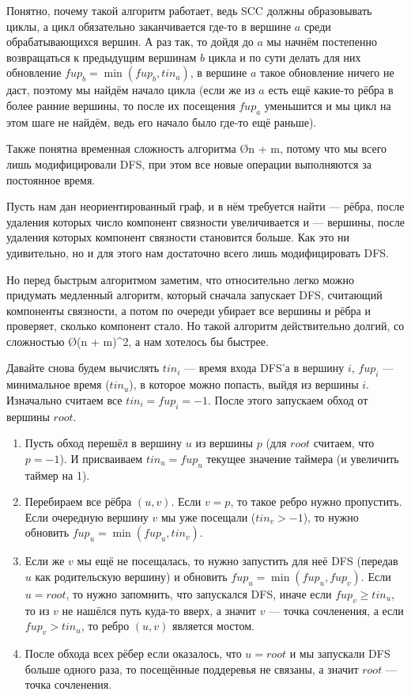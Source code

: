 Понятно, почему такой алгоритм работает, ведь SCC должны образовывать циклы, а цикл обязательно заканчивается где-то в вершине $a$ среди обрабатывающихся вершин. А раз так, то дойдя до $a$ мы начнём постепенно возвращаться к предыдущим вершинам $b$ цикла и по сути делать для них обновление $fup_b = \min(fup_b, tin_a)$, в вершине $a$ такое обновление ничего не даст, поэтому мы найдём начало цикла (если же из $a$ есть ещё какие-то рёбра в более ранние вершины, то после их посещения $fup_a$ уменьшится и мы цикл на этом шаге не найдём, ведь его начало было где-то ещё раньше).

Также понятна временная сложность алгоритма \O{n + m}, потому что мы всего лишь модифицировали DFS, при этом все новые операции выполняются за постоянное время.


Пусть нам дан неориентированный граф, и в нём требуется найти  — рёбра, после удаления которых число компонент связности увеличивается и  — вершины, после удаления которых компонент связности становится больше. Как это ни удивительно, но и для этого нам достаточно всего лишь модифицировать DFS.

Но перед быстрым алгоритмом заметим, что относительно легко можно придумать медленный алгоритм, который сначала запускает DFS, считающий компоненты связности, а потом по очереди убирает все вершины и рёбра и проверяет, сколько компонент стало. Но такой алгоритм действительно долгий, со сложностью \O{(n + m)^2}, а нам хотелось бы быстрее.

Давайте снова будем вычислять $tin_i$ — время входа DFS'а в вершину $i$, $fup_i$ — минимальное время ($tin_u$), в которое можно попасть, выйдя из вершины $i$. Изначально считаем все $tin_i = fup_i = -1$. После этого запускаем обход от вершины $root$.

\begin{enumerate}
    \item Пусть обход перешёл в вершину $u$ из вершины $p$ (для $root$ считаем, что $p = -1$). И присваиваем $tin_u = fup_u$ текущее значение таймера (и увеличить таймер на 1).
     \item Перебираем все рёбра $(u, v)$. Если $v = p$, то такое ребро нужно пропустить. Если очередную вершину $v$ мы уже посещали ($tin_v > -1$), то нужно обновить $fup_u = \min(fup_u, tin_v)$.
     \item Если же $v$ мы ещё не посещалась, то нужно запустить для неё DFS (передав $u$ как родительскую вершину) и обновить $fup_u = \min (fup_u, fup_v)$. Если $u = root$, то нужно запомнить, что запускался DFS, иначе если $fup_v \geq tin_u$, то из $v$ не нашёлся путь куда-то вверх, а значит $v$ — точка сочленения, а если $fup_v > tin_u$, то ребро $(u, v)$ является мостом.
     \item После обхода всех рёбер если оказалось, что $u = root$ и мы запускали DFS больше одного раза, то посещённые поддеревья не связаны, а значит $root$ — точка сочленения.
\end{enumerate}

